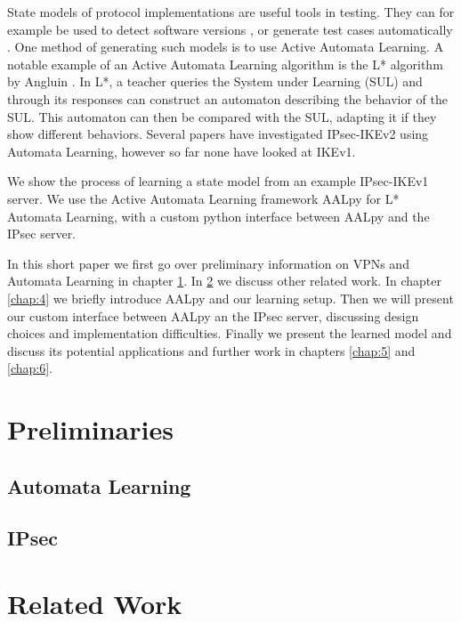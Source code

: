 \documentclass[runningheads]{llncs}
\begin{document}
State models of protocol implementations are useful tools in testing. They can for example be used to detect software versions \cite{pferscher2021fingerprinting}, or generate test cases automatically \cite{pferscher2022fuzzing}. One method of generating such models is to use Active Automata Learning. A notable example of an Active Automata Learning algorithm is the L* algorithm by Angluin \cite{angluin1987learning}. In L*, a teacher queries the System under Learning (SUL) and through its responses can construct an automaton describing the behavior of the SUL. This automaton can then be compared with the SUL, adapting it if they show different behaviors. Several papers have investigated IPsec-IKEv2 using Automata Learning, however so far none have looked at IKEv1. 

We show the process of learning a state model from an example IPsec-IKEv1 server. We use the Active Automata Learning framework AALpy \cite{muvskardin2022aalpy} for L* Automata Learning, with a custom python interface between AALpy and the IPsec server.

In this short paper we first go over preliminary information on VPNs and Automata Learning in chapter \ref{chap:2}. In \ref{chap:3} we discuss other related work. In chapter \ref{chap:4} we briefly introduce AALpy and our learning setup. Then we will present our custom interface between AALpy an the IPsec server, discussing design choices and implementation difficulties. Finally we present the learned model and discuss its potential applications and further work in chapters \ref{chap:5} and \ref{chap:6}.



\section{Preliminaries} \label{chap:2}
\subsection{Automata Learning}
\subsection{IPsec}

\section{Related Work} \label{chap:3}%
\end{document}
